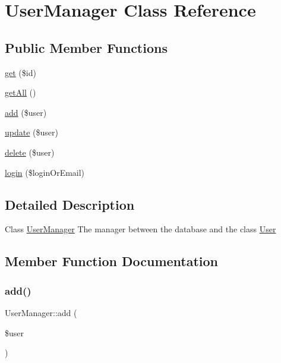 \hypertarget{classUserManager}{}\section{User\+Manager Class Reference}
\label{classUserManager}
\subsection*{Public Member Functions}
\begin{DoxyCompactItemize}
\item 
\hyperlink{classUserManager_ab3d9ba3132004b92400d15af5bbcc1cb}{get} (\$id)
\item 
\hyperlink{classUserManager_af3f58e58e0bc214487d5ac280000c37f}{get\+All} ()
\item 
\hyperlink{classUserManager_a5cd4f721609a104f8b227cf9c81ab2af}{add} (\$user)
\item 
\hyperlink{classUserManager_a7f7c60b72d1e89fd33b6192a088b12fb}{update} (\$user)
\item 
\hyperlink{classUserManager_a5f459de68fa28901e912f0616beeaf5f}{delete} (\$user)
\item 
\hyperlink{classUserManager_a580f9418a27620a623e858881a2a181a}{login} (\$login\+Or\+Email)
\end{DoxyCompactItemize}


\subsection{Detailed Description}
Class \hyperlink{classUserManager}{User\+Manager} The manager between the database and the class \hyperlink{classUser}{User} 

\subsection{Member Function Documentation}
\mbox{\label{classUserManager_a5cd4f721609a104f8b227cf9c81ab2af}} 
\subsubsection{\texorpdfstring{add()}{add()}}
{\footnotesize\ttfamily User\+Manager\+::add (\begin{DoxyParamCaption}\item[{}]{\$user }\end{DoxyParamCaption})}

